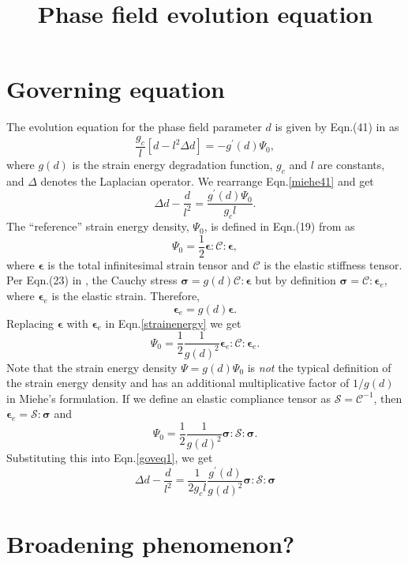\documentclass[10pt,onecolumn]{article}
\title{Phase field evolution equation}
\author{}
\date{}
\newcommand{\bs}[1]{\ensuremath{\boldsymbol{#1}}}
\newcommand{\e}{\bs{\epsilon}}
\newcommand{\s}{\bs{\sigma}}
\newcommand{\C}{\mathcal{C}}
\newcommand{\eS}{\mathcal{S}}
\begin{document}
\maketitle

\section{Governing equation}
The evolution equation for the phase field parameter $d$ is given by Eqn.(41) in \cite{miehe2010} as
%
\begin{equation}
\label{miehe41}
\frac{g_c}{l}\left[d-l^2\Delta d\right]=-g^\prime(d)\Psi_0,
\end{equation}
%
where $g(d)$ is the strain energy degradation function, $g_c$ and $l$ are constants, and $\Delta$ denotes the Laplacian operator. We rearrange Eqn.\eqref{miehe41} and get
%
\begin{equation}
\label{goveq1}
\Delta d-\frac{d}{l^2}=\frac{g^\prime(d)\Psi_0}{g_c l}.
\end{equation}
%
The ``reference'' strain energy density, $\Psi_0$, is defined in Eqn.(19) from \cite{miehe2010} as 
%
\begin{equation}
\label{strainenergy}
\Psi_0=\frac{1}{2} \e:\C:\e,
\end{equation}
%
where  $\e$ is the total infinitesimal strain tensor and $\C$ is the elastic stiffness tensor. Per Eqn.(23) in \cite{miehe2010}, the Cauchy stress $\s=g(d) \C:\e$ but by definition $\s=\C:\e_e$, where $\e_e$ is the elastic strain. Therefore,
%
\[\e_e=g(d)\e.\]
%
Replacing $\e$ with $\e_e$ in Eqn.\eqref{strainenergy} we get
%
\begin{equation}
\label{strainenergy2}
\Psi_0=\frac{1}{2}\frac{1}{g(d)^2}\e_e:\C:\e_e.
\end{equation}
%
Note that the strain energy density $\Psi=g(d) \Psi_0$ is \emph{not} the typical definition of the strain energy density and has an additional multiplicative factor of $1/g(d)$ in Miehe's formulation. If we define an elastic compliance tensor as $\eS=\C^{-1}$, then $\e_e=\eS:\s$ and
%
\begin{equation}
\label{strainenergy3}
\Psi_0=\frac{1}{2}\frac{1}{g(d)^2}\s:\eS:\s.
\end{equation}
%
Substituting this into Eqn.\eqref{goveq1}, we get
%
\begin{equation}
\label{goveq2}
\Delta d-\frac{d}{l^2}=\frac{1}{2g_c l}\frac{g^\prime(d)}{g(d)^2} \s:\eS:\s
\end{equation}

\section{Broadening phenomenon?}
\end{document}
